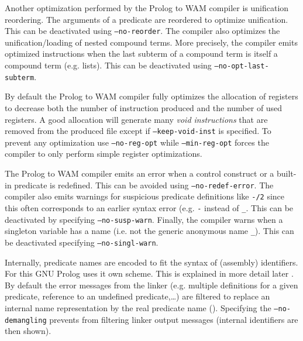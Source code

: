 Another optimization performed by the Prolog to WAM compiler is unification
reordering. The arguments of a predicate are reordered to optimize
unification. This can be deactivated using \texttt{--no-reorder}. The
compiler also optimizes the unification/loading of nested compound terms.
More precisely, the compiler emits optimized instructions when the last
subterm of a compound term is itself a compound term (e.g. lists). This can
be deactivated using \texttt{--no-opt-last-subterm}.

By default the Prolog to WAM compiler fully optimizes the allocation of
registers to decrease both the number of instruction produced and the number
of used registers. A good allocation will generate many \emph{void
instructions} that are removed from the produced file except if
\texttt{--keep-void-inst} is specified. To prevent any optimization use
\texttt{--no-reg-opt} while \texttt{--min-reg-opt} forces the compiler to
only perform simple register optimizations.

The Prolog to WAM compiler emits an error when a control construct or a
built-in predicate is redefined. This can be avoided using
\texttt{--no-redef-error}. The compiler also emits warnings for suspicious
predicate definitions like \texttt{-/2} since this often corresponds to an
earlier syntax error (e.g. \texttt{-} instead of \texttt{\_}. This can be
deactivated by specifying \texttt{--no-susp-warn}. Finally, the compiler
warns when a singleton variable has a name (i.e. not the generic anonymous
name \texttt{\_}). This can be deactivated specifying
\texttt{--no-singl-warn}.

Internally, predicate names are encoded to fit the syntax of (assembly)
identifiers. For this GNU Prolog uses it own  scheme. This
is explained in more detail later . By default
the error messages from the linker (e.g. multiple definitions for a given
predicate, reference to an undefined predicate,\ldots) are filtered to
replace an internal name representation by the real predicate name
(). Specifying the \texttt{--no-demangling} prevents
 from filtering linker output messages (internal identifiers are
then shown).

